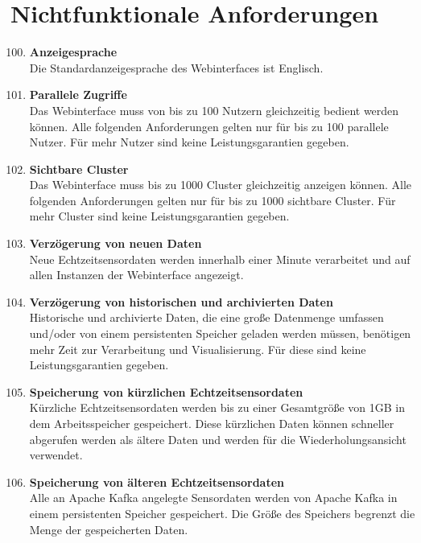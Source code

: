 \chapter{Nichtfunktionale Anforderungen}
\begin{enumerate}[label=\textbf{NF\arabic{enumi}0}]
	\setcounter{enumi}{99}
	
	\item \textbf{Anzeigesprache}\\
	Die Standardanzeigesprache des Webinterfaces ist Englisch.
	
	\item \textbf{Parallele Zugriffe}\\
	Das Webinterface muss von bis zu 100 Nutzern gleichzeitig bedient werden können. Alle folgenden Anforderungen gelten nur für bis zu 100 parallele Nutzer. Für mehr Nutzer sind keine Leistungsgarantien gegeben.
	
	\item \textbf{Sichtbare Cluster}\\
	Das Webinterface muss bis zu 1000 Cluster gleichzeitig anzeigen können. Alle folgenden Anforderungen gelten nur für bis zu 1000 sichtbare Cluster. Für mehr Cluster sind keine Leistungsgarantien gegeben.
	
	\item \textbf{Verzögerung von neuen Daten}\\
	Neue Echtzeitsensordaten werden innerhalb einer Minute verarbeitet und auf allen Instanzen der Webinterface angezeigt.
	
	\item \textbf{Verzögerung von historischen und archivierten Daten}\\
	Historische und archivierte Daten, die eine große Datenmenge umfassen und/oder von einem persistenten Speicher geladen werden müssen, benötigen mehr Zeit zur Verarbeitung und Visualisierung. Für diese sind keine Leistungsgarantien gegeben.
	
	\item \textbf{Speicherung von kürzlichen Echtzeitsensordaten}\\
	Kürzliche Echtzeitsensordaten werden bis zu einer Gesamtgröße von 1GB in dem Arbeitsspeicher gespeichert. Diese kürzlichen Daten können schneller abgerufen werden als ältere Daten und werden für die Wiederholungsansicht verwendet.
	
	\item \textbf{Speicherung von älteren Echtzeitsensordaten}\\
	Alle an Apache Kafka angelegte Sensordaten werden von Apache Kafka in einem persistenten Speicher gespeichert. Die Größe des Speichers begrenzt die Menge der gespeicherten Daten.
	

\end{enumerate}
